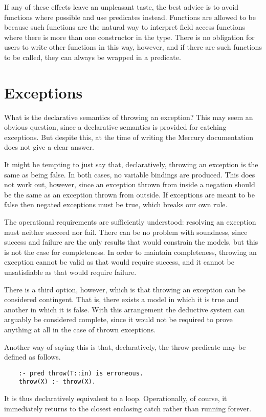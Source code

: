 If any of these effects leave an unpleasant taste,
the best advice is to avoid  functions where possible
and use  predicates instead.
Functions are allowed to be 
because such functions are the natural way
to interpret field access functions
where there is more than one constructor in the type.
There is no obligation for users to write other functions in this way,
however,
and if there are such functions to be called,
they can always be wrapped in a  predicate.


\section{Exceptions}
\label{sec:exceptions}

What is the declarative semantics of throwing an exception?
This may seem an obvious question,
since a declarative semantics is provided for catching exceptions.
But despite this, at the time of writing
the Mercury documentation does not give a clear answer.

It might be tempting to just say that, declaratively,
throwing an exception is the same as being false.
In both cases, no variable bindings are produced.
This does not work out, however,
since an exception thrown from inside a negation
should be the same as an exception thrown from outside.
If exceptions are meant to be false
then negated exceptions must be true,
which breaks our own rule.

The operational requirements are sufficiently understood:
resolving an exception must neither succeed nor fail.
There can be no problem with soundness,
since success and failure are
the only results that would constrain the models,
but this is not the case for completeness.
In order to maintain completeness,
throwing an exception cannot be valid as that would require success,
and it cannot be unsatisfiable as that would require failure.

There is a third option, however,
which is that throwing an exception
can be considered contingent\label{gi:contingent2}.
That is, there exists a model in which it is true
and another in which it is false.
With this arrangement
the deductive system can arguably be considered complete,
since it would not be required to
prove anything at all in the case of thrown exceptions.

Another way of saying this is that, declaratively,
the throw predicate may be defined as follows.
\begin{verbatim}
    :- pred throw(T::in) is erroneous.
    throw(X) :- throw(X).
\end{verbatim}
It is thus declaratively equivalent to a loop.
Operationally, of course,
it immediately returns to the closest enclosing catch
rather than running forever.


